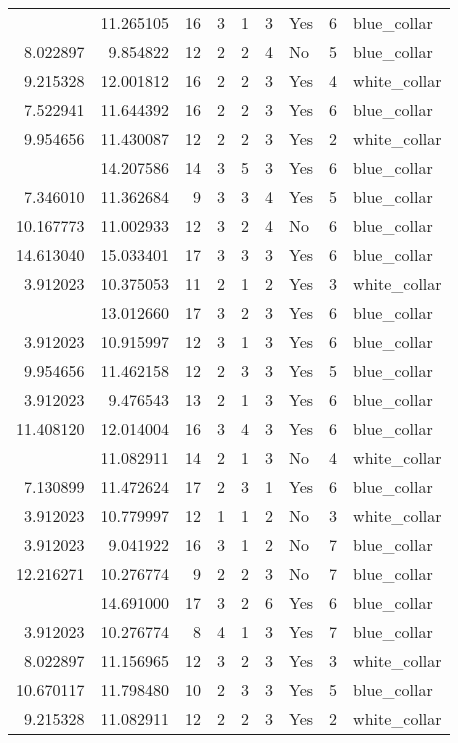 \documentclass[
]{article}
\begin{document}
\begin{longtable}[t]{rrrrrllrl}
\addlinespace
3.912023 & 11.265105 & 16 & 3 & 1 & 3 & Yes & 6 & blue\_collar\\
8.022897 & 9.854822 & 12 & 2 & 2 & 4 & No & 5 & blue\_collar\\
9.215328 & 12.001812 & 16 & 2 & 2 & 3 & Yes & 4 & white\_collar\\
7.522941 & 11.644392 & 16 & 2 & 2 & 3 & Yes & 6 & blue\_collar\\
9.954656 & 11.430087 & 12 & 2 & 2 & 3 & Yes & 2 & white\_collar\\
\addlinespace
12.206323 & 14.207586 & 14 & 3 & 5 & 3 & Yes & 6 & blue\_collar\\
7.346010 & 11.362684 & 9 & 3 & 3 & 4 & Yes & 5 & blue\_collar\\
10.167773 & 11.002933 & 12 & 3 & 2 & 4 & No & 6 & blue\_collar\\
14.613040 & 15.033401 & 17 & 3 & 3 & 3 & Yes & 6 & blue\_collar\\
3.912023 & 10.375053 & 11 & 2 & 1 & 2 & Yes & 3 & white\_collar\\
\addlinespace
10.597884 & 13.012660 & 17 & 3 & 2 & 3 & Yes & 6 & blue\_collar\\
3.912023 & 10.915997 & 12 & 3 & 1 & 3 & Yes & 6 & blue\_collar\\
9.954656 & 11.462158 & 12 & 2 & 3 & 3 & Yes & 5 & blue\_collar\\
3.912023 & 9.476543 & 13 & 2 & 1 & 3 & Yes & 6 & blue\_collar\\
11.408120 & 12.014004 & 16 & 3 & 4 & 3 & Yes & 6 & blue\_collar\\
\addlinespace
3.912023 & 11.082911 & 14 & 2 & 1 & 3 & No & 4 & white\_collar\\
7.130899 & 11.472624 & 17 & 2 & 3 & 1 & Yes & 6 & blue\_collar\\
3.912023 & 10.779997 & 12 & 1 & 1 & 2 & No & 3 & white\_collar\\
3.912023 & 9.041922 & 16 & 3 & 1 & 2 & No & 7 & blue\_collar\\
12.216271 & 10.276774 & 9 & 2 & 2 & 3 & No & 7 & blue\_collar\\
\addlinespace
11.002933 & 14.691000 & 17 & 3 & 2 & 6 & Yes & 6 & blue\_collar\\
3.912023 & 10.276774 & 8 & 4 & 1 & 3 & Yes & 7 & blue\_collar\\
8.022897 & 11.156965 & 12 & 3 & 2 & 3 & Yes & 3 & white\_collar\\
10.670117 & 11.798480 & 10 & 2 & 3 & 3 & Yes & 5 & blue\_collar\\
9.215328 & 11.082911 & 12 & 2 & 2 & 3 & Yes & 2 & white\_collar\\

\end{longtable}
\end{document}
